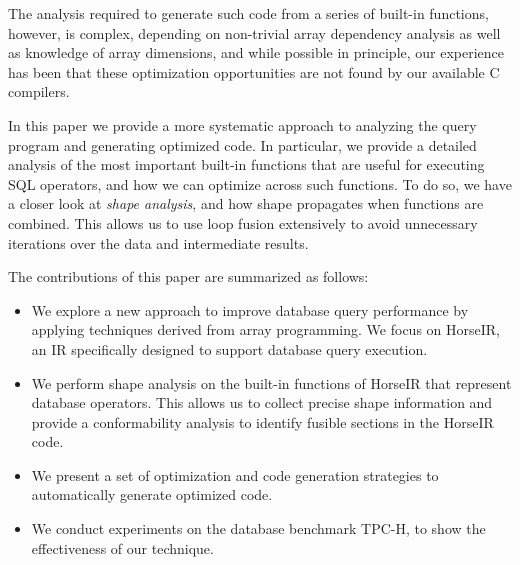 \noindent{}The analysis required to generate such code from a series of built-in functions, however, is complex,
depending on non-trivial array dependency analysis as well as knowledge of array dimensions, and 
while possible in principle, our experience has been that these optimization opportunities are not found by our available C compilers.


In this paper we provide a more systematic approach to
analyzing the query program and generating optimized code. In particular, we provide
a detailed analysis of the most important built-in functions that are useful
for executing SQL operators, and how we can optimize across such functions.
To do so, we have a closer look at \textit{shape analysis}, and how shape propagates
when functions are combined. This allows us to use loop fusion extensively to
avoid unnecessary iterations over the data and intermediate results.  

The contributions of this paper are summarized as follows:

\begin{itemize}
\item We explore a new approach to improve database query performance by
      applying techniques derived from array programming. We focus on HorseIR, an IR specifically designed to support database query execution.
\item We perform shape analysis on the built-in functions of HorseIR that represent database operators. This allows us to collect precise shape information and provide a conformability analysis to identify fusible sections in the HorseIR code. 
\item We present a set of optimization and code generation strategies to automatically
      generate optimized code.
\item We conduct experiments on the database benchmark TPC-H, to show the effectiveness of our technique.
\end{itemize}


